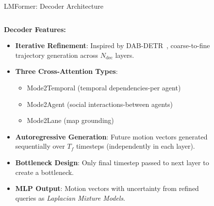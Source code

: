 \documentclass[10pt,aspectratio=169]{beamer}
\begin{document}
\begin{frame}{LMFormer: Decoder Architecture}
    \begin{columns}[T]
        \begin{column}{0.5\textwidth}
            \textbf{Decoder Features:}
            \begin{itemize}
                \item \textbf{Iterative Refinement}: Inspired by DAB-DETR~\cite{liu2022dabdetr}, coarse-to-fine trajectory generation across \(N_{\text{dec}}\) layers.
                \item \textbf{Three Cross-Attention Types}:
                    \begin{itemize}
                        \item Mode2Temporal (temporal dependencies-per agent)
                        \item Mode2Agent (social interactions-between agents)
                        \item Mode2Lane (map grounding)
                    \end{itemize}
                \item \textbf{Autoregressive Generation}: Future motion vectors generated sequentially over \(T_f\) timesteps (independently in each layer).
                \item \textbf{Bottleneck Design}: Only final timestep passed to next layer to create a bottleneck.
                \item \textbf{MLP Output}: Motion vectors with uncertainty from refined queries as \emph{Laplacian Mixture Models}.
            \end{itemize}
        \end{column}
        \begin{column}{0.5\textwidth}
            \begin{figure}

\end{figure}
\end{column}
\end{columns}
\end{frame}
\end{document}
